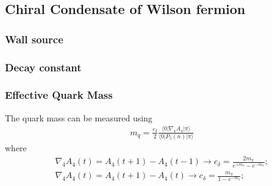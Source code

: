 \subsection{\label{ChiralCondensateWilson}Chiral Condensate of Wilson fermion}

\subsubsection{\label{WallSource}Wall source}


\subsubsection{\label{DecayConstant}Decay constant}



\subsubsection{\label{EffectiveQuarkMass}Effective Quark Mass}

The quark mass can be measured using
\begin{equation}
\begin{split}
&m_q=\frac{c_{\delta}}{2}\frac{\langle 0| \nabla _4 A_4 |\pi\rangle }{\langle 0|P_5(n)|\pi\rangle}
\end{split}
\end{equation}
where 
\begin{equation}
\begin{split}
&\nabla _4 A_4 (t)= A_4(t+1) - A_4(t-1) \to c_{\delta}=\frac{2m_{\pi}}{e^{+m_{\pi}}-e^{-m_{\pi}}};\\
&\nabla _4 A_4 (t)= A_4(t+1) - A_4(t) \to c_{\delta}=\frac{m_{\pi}}{1-e^{-m_{\pi}}};\\
\end{split}
\end{equation}
